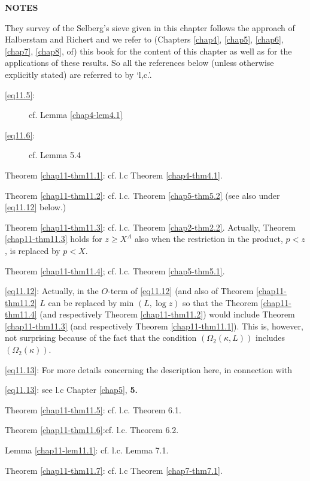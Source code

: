 \medskip 
\begin{center}
\textbf{NOTES}
\end{center}
  
They survey of the Selberg's sieve given in this chapter follows the
approach of Halberstam and Richert \cite{key1} and we refer to (Chapters
\ref{chap4}, \ref{chap5}, \ref{chap6}, \ref{chap7}, \ref{chap8}, of)
this book for the content of this chapter as well 
as for the applications of  these results. So all the references below
(unless otherwise explicitly stated) are referred to by `l,c.'. 
\begin{description}
\item[\eqref{eq11.5}:] cf. Lemma \ref{chap4-lem4.1}
\item[\eqref{eq11.6}:] cf. Lemma 5.4
 \end{description}
 
Theorem \ref{chap11-thm11.1}: cf. l.c Theorem \ref{chap4-thm4.1}.

Theorem \ref{chap11-thm11.2}: cf. l.c. Theorem \ref{chap5-thm5.2} (see
also under \eqref{eq11.12} below.) 

Theorem \ref{chap11-thm11.3}: cf. l.c. Theorem
\ref{chap2-thm2.2}. Actually, Theorem \ref{chap11-thm11.3} holds for
$z \ge X^A$  also when the restriction in the product, $p<z$, is
replaced by $p<X$.  

Theorem \ref{chap11-thm11.4}; cf. l.c. Theorem \ref{chap5-thm5.1}.

\eqref{eq11.12}: Actually, in the $O$-term of \eqref{eq11.12}  (and
also of Theorem \ref{chap11-thm11.2} $L$ can   be replaced by  min
$(L, \log z)$ so that the Theorem \ref{chap11-thm11.4} (and
respectively Theorem \ref{chap11-thm11.2}) would include Theorem
\ref{chap11-thm11.3} (and respectively Theorem
\ref{chap11-thm11.1}). This is, however, not surprising because of the
fact that the condition $(\Omega_2 (\kappa,L))$ includes
$(\Omega_2(\kappa))$. 

\eqref{eq11.13}: For more details concerning the  description here, in
connection with  

\eqref{eq11.13}: see  l.c Chapter \ref{chap5}, {\bf 5.}

Theorem \ref{chap11-thm11.5}: cf. l.c. Theorem  6.1.

Theorem \ref{chap11-thm11.6}:\pageoriginale cf. l.c. Theorem 6.2. 

Lemma \ref{chap11-lem11.1}: cf. l.c. Lemma 7.1.

Theorem \ref{chap11-thm11.7}: cf. l.c Theorem \ref{chap7-thm7.1}.

